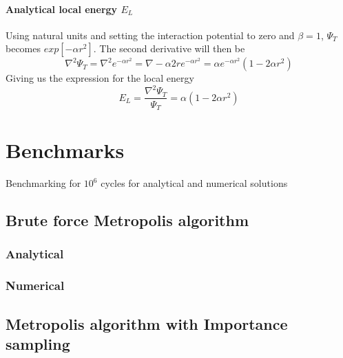 \documentclass[12pt]{article}
\begin{document}
  \paragraph{Analytical local energy $E_L$}
   
  Using natural units and setting the interaction potential to zero and $\beta = 1$,
  $\Psi_T$ becomes $exp[-\alpha r^2]$. The second derivative will then be
  \begin{equation}
    \nabla^2\Psi_T = \nabla^2 e^{-\alpha r^2} = \nabla -\alpha 2r e^{-\alpha r^2}%
    = \alpha e^{-\alpha r^2}(1 - 2\alpha r^2)
  \end{equation}
  Giving us the expression for the local energy
  \begin{equation}
    E_L = \frac{\nabla^2 \Psi_T}{\Psi_T} = \alpha (1 - 2\alpha r^2)
  \end{equation}

  \newpage
  \appendix
  \section{Benchmarks}
  Benchmarking for $10^6$ cycles for analytical and numerical solutions

  \subsection{Brute force Metropolis algorithm}
  \subsubsection{Analytical}
  
  \newline
  
  \newline
  
  \vspace{1cm}
  \newline
  \subsubsection{Numerical}
  
  \newline
  
  \newline
  

  \subsection{Metropolis algorithm with Importance sampling}
  
  \newline
  
  \newline
  
  \newline
  
  \newline
  
  \newline
  
\end{document}
